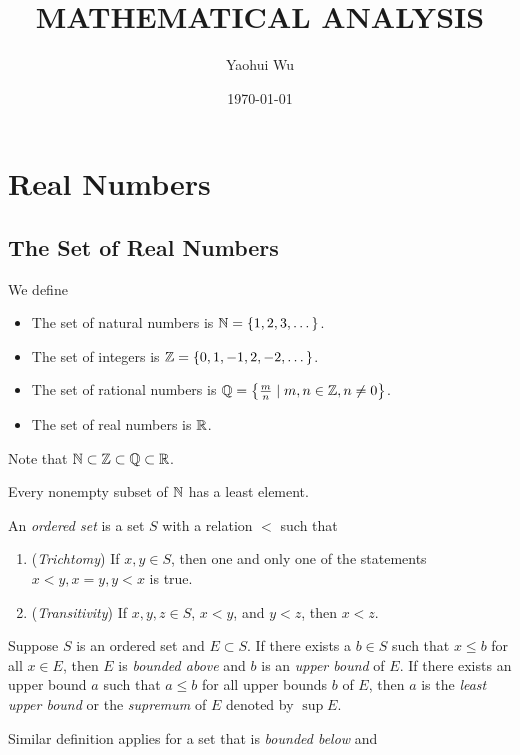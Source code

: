 \documentclass[12pt]{article}
\title{MATHEMATICAL ANALYSIS}
\author{Yaohui Wu}
\date{\today}
\begin{document}
\maketitle

\section{Real Numbers}
\subsection{The Set of Real Numbers}
We define
\begin{itemize}
    \item The set of natural numbers is \(\mathbb{N}=\{1,2,3,\dots\}\).
    \item The set of integers is \(\mathbb{Z}=\{0,1,-1,2,-2,\dots\}\).
    \item The set of rational numbers is
    \(\mathbb{Q}=\left\{\frac{m}{n}\mid m,n\in\mathbb{Z},n\neq0\right\}\).
    \item The set of real numbers is \(\mathbb{R}\).
\end{itemize}
Note that \(\mathbb{N}\subset\mathbb{Z}\subset\mathbb{Q}\subset\mathbb{R}\).
\begin{definition}
    Every nonempty subset of \(\mathbb{N}\) has a least element.
\end{definition}
\begin{definition}
    An \textit{ordered set} is a set \(S\) with a relation \(<\) such that
    \begin{enumerate}
        \item (\textit{Trichtomy}) If \(x,y\in S\), then one and only one of
        the statements \(x<y,x=y,y<x\) is true.
        \item (\textit{Transitivity}) If \(x,y,z\in S\), \(x<y\), and \(y<z\),
        then \(x<z\).
    \end{enumerate}
\end{definition}
\begin{definition}
    Suppose \(S\) is an ordered set and \(E\subset S\).
    If there exists a \(b\in S\) such that \(x\leq b\) for all \(x\in E\),
    then \(E\) is \textit{bounded above} and \(b\) is an \textit{upper bound}
    of \(E\).
    If there exists an upper bound \(a\) such that \(a\leq b\) for all upper
    bounds \(b\) of \(E\), then \(a\) is the \textit{least upper bound} or the
    \textit{supremum} of \(E\) denoted by \(\sup E\).
\end{definition}
Similar definition applies for a set that is \textit{bounded below} and
\end{document}

